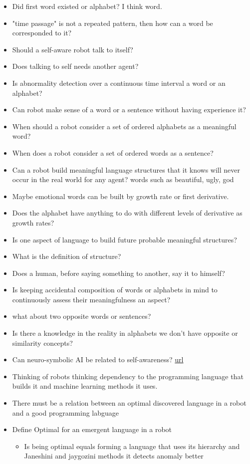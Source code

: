     \begin{itemize}
        \item Did first word existed or alphabet? I think word.
        \item "time passage" is not a repeated pattern, then how can a word be corresponded to it?
        \item Should a self-aware robot talk to itself?
        \item Does talking to self needs another agent?
        \item Is abnormality detection over a continuous time interval a word or an alphabet?
        \item Can robot make sense of a word or a sentence without having experience it?
        \item When should a robot consider a set of ordered alphabets as a meaningful word?
        \item When does a robot consider a set of ordered words as a sentence?
        \item Can a robot build meaningful language structures that it knows will never occur in the real world for any agent? words such as beautiful, ugly, god
        \item Maybe emotional words can be built by growth rate or first derivative.
        \item Does the alphabet have anything to do with different levels of derivative as growth rates?
        \item Is one aspect of language to build future probable meaningful structures?
        \item What is the definition of structure?
        \item Does a human, before saying something to another, say it to himself?
        \item Is keeping accidental composition of words or alphabets in mind to continuously assess their meaningfulness an aspect?
        \item what about two opposite words or sentences?
        \item Is there a knowledge in the reality in alphabets we don't have opposite or similarity concepts?
        \item Can neuro-symbolic AI be related to self-awareness? \href{https://en.wikipedia.org/wiki/Neuro-symbolic_AI}{url}
        \item Thinking of robots thinking dependency to the programming language that builds it and machine learning methods it uses.
        \item There must be a relation between an optimal discovered language in a robot and a good programming labguage
        \item Define Optimal for an emergent language in a robot
            \begin{itemize}
                \item Is being optimal equals forming a language that uses its hierarchy and Janeshini and jaygozini methods it detects anomaly better
            \end{itemize}
    \end{itemize}